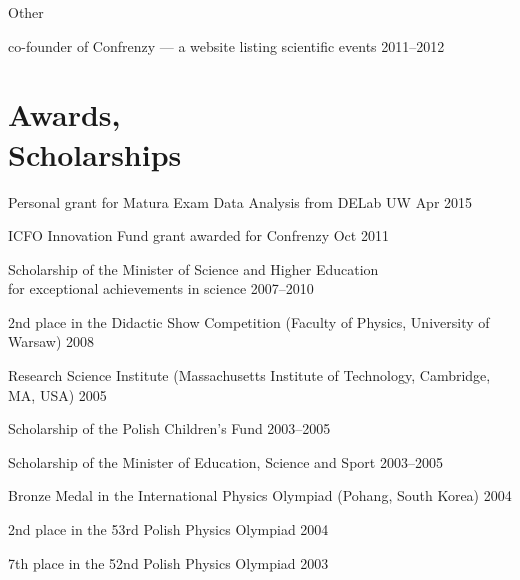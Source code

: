 \documentclass[margin,line]{resume}
\begin{document}
\begin{resume}
     Other
	        \begin{list2}
	    \item co-founder of Confrenzy --- a website listing scientific events \hfill 2011--2012
                \end{list2} 



\vspace{3mm}

    \section{\mysidestyle Awards,\\Scholarships}
    \begin{list2}
        \item Personal grant for Matura Exam Data Analysis from DELab UW \hfill {Apr 2015}
    	\item ICFO Innovation Fund grant awarded for Confrenzy \hfill Oct 2011
        \item Scholarship of the Minister of Science and Higher Education\\for exceptional achievements in science \hfill 2007--2010
        \item 2nd  place in the Didactic Show Competition (Faculty of Physics, University of Warsaw)  \hfill 2008  %
        \item Research Science Institute (Massachusetts Institute of Technology, Cambridge, MA, USA) \hfill 2005
        \item Scholarship of the Polish Children's Fund \hfill 2003--2005
        \item Scholarship of the Minister of Education, Science and Sport \hfill 2003--2005
        \item Bronze Medal in the International Physics Olympiad (Pohang, South Korea) \hfill 2004
        \item 2nd  place in the 53rd Polish Physics Olympiad \hfill 2004
        \item 7th  place in the 52nd Polish Physics Olympiad \hfill 2003
    \end{list2}


\end{resume}
\end{document}
